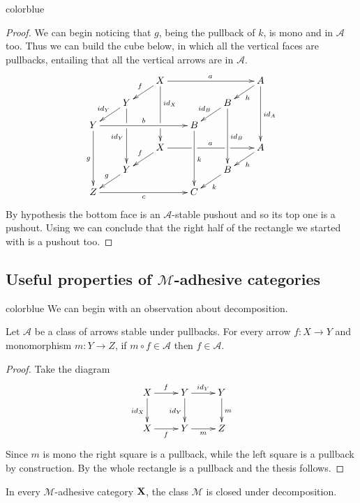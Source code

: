 \documentclass[a4paper,UKenglish,cleveref,pdftex,thm-restate,numberwithinsect]{lipics-v2021}
\newcommand{\full}[1]{{color{blue}#1}}
\newcommand{\full}[1]{}
\newcommand{\id}[1]{\mathsf{id}_{#1}}
\def\X{\textbf {\textup{X}}}
\def\Y{\textbf {\textup{Y}}}
\begin{document}
\full{ 
\begin{proof}
	We can begin noticing that $g$, being the pullback of $k$, is mono and in $\mathcal{A}$ too. Thus we can build the cube below, in which all the vertical faces are pullbacks, entailing that all the vertical arrows are in $\mathcal{A}$.
	\[\xymatrix@C=20pt@R=10pt{ & &X\ar[dl]_{f} \ar[ddd]^(.333333){\id{X}}|(.666666)\hole\ar[rrr]^{a} &&&A \ar[ddd]^{\id{A}} \ar[dl]^{h}\\& Y\ar[dl]_{\id{Y}} \ar[ddd]|(.333333)\hole_{\id{Y}} &&&B \ar[ddd]^{\id{B}} \ar[dl]_{\id{B}} \\Y \ar[ddd]_{g} \ar[rrr]^{b}&&& B\ar[ddd]^{k}\\&&X \ar[rrr]|(.34)\hole^{a}|(.67)\hole \ar[dl]_{f}&&& A \ar[dl]^{h}\\ & Y  \ar[dl]_{g}&&& B \ar[dl]^{k}\\ Z\ar[rrr]_{c} &&& C}\]
	By hypothesis the bottom face is an $\mathcal{A}$-stable pushout and so its top one is a pushout. Using \Cref{lem:po1} we can conclude that the right half of the rectangle we  started with is a pushout too.
\end{proof}}

\subsection{Useful properties of $\mathcal{M}$-adhesive categories}

\full{ 
We can begin with an observation about decomposition.

\begin{proposition}
  \label{prop:deco}Let $\mathcal{A}$ be a class of arrows stable under
  pullbacks. For every arrow $f\colon X\to Y$ and monomorphism
  $m\colon Y\to Z$, if $m\circ f \in\mathcal{A}$ then
  $f\in \mathcal{A}$.
\end{proposition}
\begin{proof}
  Take the diagram
  \[\xymatrix{X \ar[d]_{\id{X}}\ar[r]^{f}& Y \ar[r]^{\id{Y}}  \ar[d]_{\id{Y}}& Y \ar[d]^{m}\\
		X \ar[r]_{f}& Y \ar[r]_{m} & Z}\]
	Since $m$ is mono the right square is a pullback, while the left square is a pullback by construction. By \Cref{lem:pb1} the whole rectangle is a pullback and the thesis follows.
\end{proof}
\begin{corollary}
  \label{cor:deco}
	In every $\mathcal{M}$-adhesive category $\X$, the class $\mathcal{M}$ is closed under decomposition.
\end{corollary}}
\end{document}
